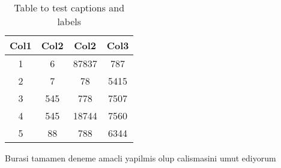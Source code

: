 \documentclass[12pt]{article}
\begin{document}
\begin{table}[h!]
\centering
\begin{tabular}{|c c c c|} 
 \hline
 Col1 & Col2 & Col2 & Col3 \\ [0.5ex] 
 \hline\hline
 1 & 6 & 87837 & 787 \\ 
 2 & 7 & 78 & 5415 \\
 3 & 545 & 778 & 7507 \\
 4 & 545 & 18744 & 7560 \\
 5 & 88 & 788 & 6344 \\ [1ex] 
 \hline
\end{tabular}
\caption{Table to test captions and labels}
\label{table:data}
\end{table}
\newpage

Burasi tamamen deneme amacli yapilmis olup calismasini umut ediyorum \pageref{table:data}
\end{document}
